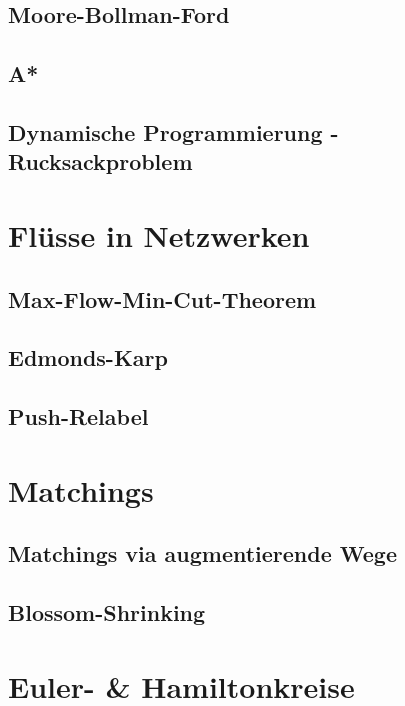 \documentclass[10pt,a4paper,landscape]{article}
\begin{document}
\begin{multicols*}{3}
            \subsection{ Moore-Bollman-Ford }

            \subsection{ A* }

            \subsection{ Dynamische Programmierung - Rucksackproblem }

        \section{ Flüsse in Netzwerken }
            \subsection{ Max-Flow-Min-Cut-Theorem }\subsection{  }

            \subsection{ Edmonds-Karp }

            \subsection{ Push-Relabel }


        \section{ Matchings }
            \subsection{ Matchings via augmentierende Wege }

            \subsection{ Blossom-Shrinking }


        \section{ Euler- \& Hamiltonkreise }

\end{multicols*}
\end{document}
